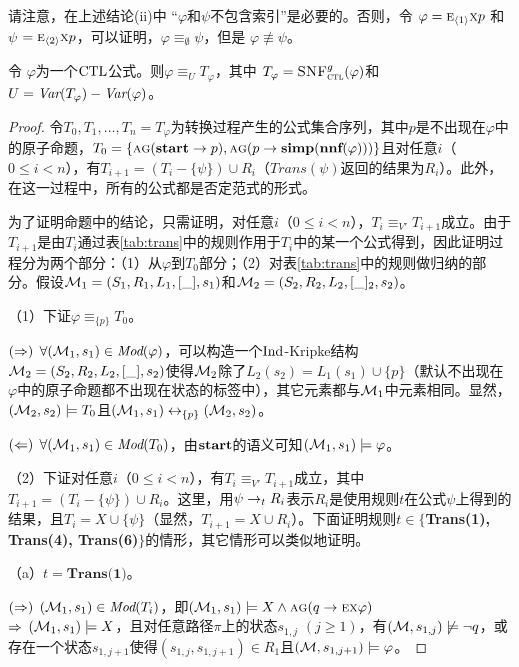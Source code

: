 请注意，在上述结论(ii)中  “$\varphi$和$\psi$不包含索引”是必要的。否则，令 $\varphi=\textsc{e}_{{\langle{1}\rangle}}\textsc{x} p$ 和  
$\psi$ $=\textsc{e}_{{\langle{2}\rangle}}\textsc{x} p$，可以证明，$\varphi\equiv_\emptyset \psi$，但是 $\varphi\not\equiv\psi$。
\begin{proposition}\label{prop:transform:V:EQ}
	令 $\varphi$为一个$\textrm{CTL}$公式。则$\varphi\equiv_UT_\varphi$，其中 $T_\varphi={\textsc{SNF}_{\textsc{ctl}}^g}(\varphi)$和
	$U=\textit{Var}(T_\varphi)-\textit{Var}(\varphi)$。
\end{proposition}
\begin{proof}
	令$T_0, T_1, \dots, T_n=T_{\varphi}$为转换过程产生的公式集合序列，其中$p$是不出现在$\varphi$中的原子命题，$T_0=\{\textsc{a} \textsc{g}(\textbf{start} \rightarrow p), \textsc{a} \textsc{g}(p \rightarrow \textbf{simp}(\textbf{nnf}(\varphi)))\}$且对任意$i$（$0\leq i < n$），有$T_{i+1} = (T_i-\{\psi\}) \cup R_i$（$Trans(\psi)$返回的结果为$R_i$）。此外，在这一过程中，所有的公式都是否定范式的形式。
	
	为了证明命题中的结论，只需证明，对任意$i$（$0\leq i < n$），$T_i \equiv_{V'} T_{i+1}$成立。由于$T_{i+1}$是由$T_i$通过表\ref{tab:trans}中的规则作用于$T_i$中的某一个公式得到，因此证明过程分为两个部分：（1）从$\varphi$到$T_0$部分；（2）对表\ref{tab:trans}中的规则做归纳的部分。假设${\cal M}_1=(S_1,R_1,L_1,[\_],s_1)$和${\cal M}_2=(S_2,R_2,L_2, [\_]_2, s_2)$。
	
	（1）下证$\varphi \equiv_{\{p\}} T_0$。
	
	$(\Rightarrow)$ $\forall ({\cal M}_1, s_1) \in \textit{Mod}(\varphi)$，可以构造一个$\textrm{Ind}$-Kripke结构${\cal M}_2=(S_2,R_2,L_2,[\_],s_2)$使得${\cal M}_2$除了$L_2(s_2)=L_1(s_1) \cup \{p\}$（默认不出现在$\varphi$中的原子命题都不出现在状态的标签中），其它元素都与${\cal M}_1$中元素相同。显然，$({\cal M}_2,s_2)\models T_0$且$({\cal M}_1,s_1) \leftrightarrow_{\{p\}} ({\cal M}_2, s_2)$。
	
	$(\Leftarrow)$ $\forall ({\cal M}_1,s_1) \in \textit{Mod}(T_0)$，由$\textbf{start}$的语义可知$({\cal M}_1,s_1) \models \varphi$。
	
	（2）下证对任意$i$（$0\leq i < n$），有$T_i \equiv_{V'} T_{i+1}$成立，其中$T_{i+1} = (T_i-\{\psi\}) \cup R_i$。这里，用$\psi \rightarrow_t R_i$表示$R_i$是使用规则$t$在公式$\psi$上得到的结果，且$T_i=X\cup \{\psi\}$（显然，$T_{i+1}=X\cup R_i$）。下面证明规则$t\in \{$\textbf{Trans(1), Trans(4), Trans(6)}$\}$的情形，其它情形可以类似地证明。
	
	（a）$t=\textbf{Trans(1)}$。
	
	$(\Rightarrow)$ $({\cal M}_1,s_1)\in \textit{Mod}(T_i)$，即$({\cal M}_1, s_1) \models X \wedge \textsc{a}\textsc{g}(q \rightarrow \textsc{e} \textsc{x} \varphi)$\\
	$\Rightarrow$ $({\cal M}_1,s_1) \models X$，且对任意路径$\pi$上的状态$s_{1,j}$ $(j\geq 1)$，有$({\cal M},s_{1,j}) \not \models \neg q$，或存在一个状态$s_{1,j+1}$使得$(s_{1,j},s_{1,j+1})
	\in R_1$且$({\cal M},s_{1,j+1}) \models \varphi$。
	

\end{proof}

